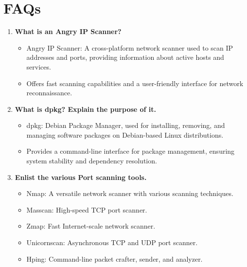 \documentclass[11pt]{article}
\begin{document}
% 

\section{FAQs}

\begin{enumerate}
    \item \textbf{What is an Angry IP Scanner?}
          \begin{itemize}
              \item Angry IP Scanner: A cross-platform network scanner used to scan IP addresses and ports, providing information about active hosts and services.
              \item Offers fast scanning capabilities and a user-friendly interface for network reconnaissance.
          \end{itemize}

    \item \textbf{What is dpkg? Explain the purpose of it.}
          \begin{itemize}
              \item dpkg: Debian Package Manager, used for installing, removing, and managing software packages on Debian-based Linux distributions.
              \item Provides a command-line interface for package management, ensuring system stability and dependency resolution.
          \end{itemize}

    \item \textbf{Enlist the various Port scanning tools.}
          \begin{itemize}
              \item Nmap: A versatile network scanner with various scanning techniques.
              \item Masscan: High-speed TCP port scanner.
              \item Zmap: Fast Internet-scale network scanner.
              \item Unicornscan: Asynchronous TCP and UDP port scanner.
              \item Hping: Command-line packet crafter, sender, and analyzer.
          \end{itemize}


\end{enumerate}
\end{document}
